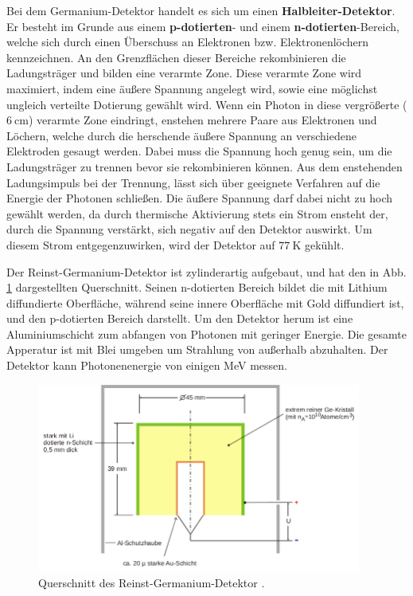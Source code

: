 Bei dem Germanium-Detektor handelt es sich um einen \textbf{Halbleiter-Detektor}.
Er besteht im Grunde aus einem \textbf{p-dotierten}- und einem \textbf{n-dotierten}-Bereich, welche
sich durch einen Überschuss an Elektronen bzw. Elektronenlöchern kennzeichnen.
An den Grenzflächen dieser Bereiche rekombinieren die Ladungsträger und bilden eine
verarmte Zone. Diese verarmte Zone wird maximiert, indem eine äußere Spannung angelegt wird, sowie
eine möglichst ungleich verteilte Dotierung gewählt wird. Wenn ein Photon in diese
vergrößerte ($\SI{6}{\centi\meter}$) verarmte Zone eindringt, enstehen mehrere
Paare aus Elektronen und Löchern, welche durch die herschende äußere Spannung an verschiedene
Elektroden gesaugt werden. Dabei muss die Spannung hoch genug sein, um die Ladungsträger zu trennen
bevor sie rekombinieren können. Aus dem enstehenden Ladungsimpuls bei der Trennung, lässt sich
über geeignete Verfahren auf die Energie der Photonen schließen.
Die äußere Spannung darf dabei nicht zu hoch gewählt werden, da durch
thermische Aktivierung stets ein Strom ensteht der, durch die Spannung verstärkt,
sich negativ auf den Detektor auswirkt. Um diesem Strom entgegenzuwirken, wird der
Detektor auf $\SI{77}{\kelvin}$ gekühlt.

Der Reinst-Germanium-Detektor ist zylinderartig aufgebaut, und hat den in Abb. \ref{fig:detektor}
dargestellten Querschnitt. Seinen n-dotierten Bereich bildet die mit Lithium diffundierte Oberfläche,
während seine innere Oberfläche mit Gold diffundiert ist, und den p-dotierten Bereich darstellt.
Um den Detektor herum ist eine Aluminiumschicht zum abfangen von Photonen mit geringer Energie.
Die gesamte Apperatur ist mit Blei umgeben um Strahlung von außerhalb abzuhalten.
Der Detektor kann Photonenenergie von einigen MeV messen.
\begin{figure}
  \centering
  \includegraphics[width=0.95\textwidth]{detektor.png}
  \caption{Querschnitt des Reinst-Germanium-Detektor \cite{anleitungv18}.}
  \label{fig:detektor}
\end{figure}

